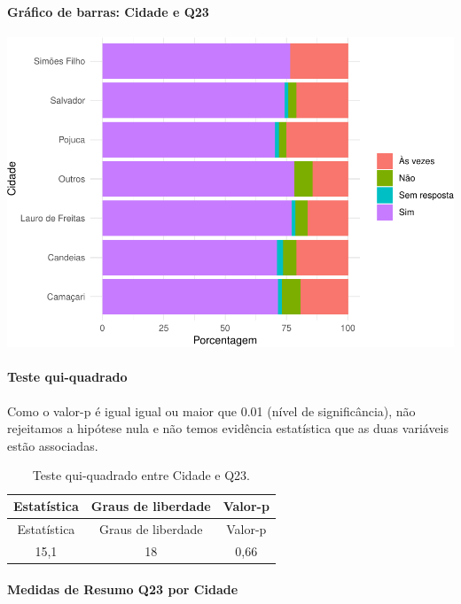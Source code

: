 \documentclass[]{article}
\let\oldparagraph\paragraph
\renewcommand{\paragraph}[1]{\oldparagraph{#1}\mbox{}}
\begin{document}
\hypertarget{gruxe1fico-de-barras-cidade-e-q23}{%
\paragraph{Gráfico de barras: Cidade e Q23}\label{gruxe1fico-de-barras-cidade-e-q23}}

\begin{center}\includegraphics[width=0.75\linewidth]{relatorio_covid19_files/figure-latex/unnamed-chunk-544-1} \end{center}

\hypertarget{teste-qui-quadrado-47}{%
\paragraph{Teste qui-quadrado}\label{teste-qui-quadrado-47}}

Como o valor-p é igual igual ou maior que 0.01 (nível de significância), não rejeitamos a hipótese nula e não temos evidência estatística que as duas variáveis estão associadas.

\begin{longtable}[]{@{}ccc@{}}
\caption{\label{tab:unnamed-chunk-546}Teste qui-quadrado entre Cidade e Q23.}\tabularnewline
\toprule
Estatística & Graus de liberdade & Valor-p\tabularnewline
\midrule
\endfirsthead
\toprule
Estatística & Graus de liberdade & Valor-p\tabularnewline
\midrule
\endhead
15,1 & 18 & 0,66\tabularnewline
\bottomrule
\end{longtable}

\cleardoublepage

\hypertarget{medidas-de-resumo-q23-por-cidade}{%
\paragraph{Medidas de Resumo Q23 por Cidade}\label{medidas-de-resumo-q23-por-cidade}}
\end{document}
